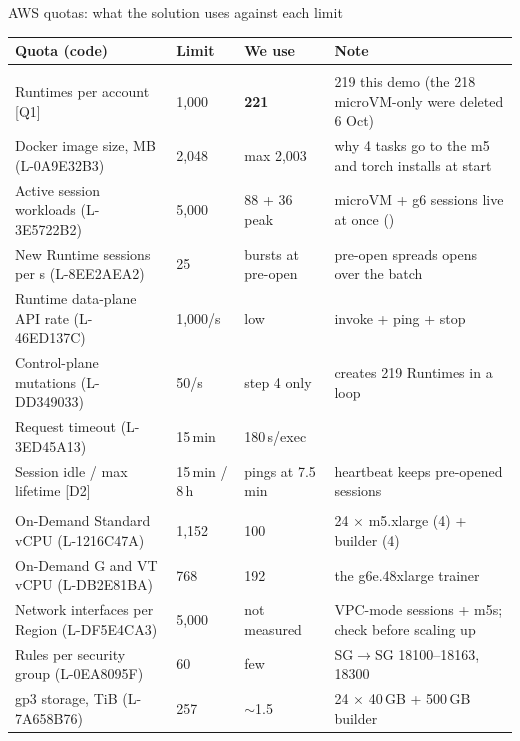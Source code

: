 \begin{frame}{AWS quotas: what the solution uses against each limit}
\tiny\setlength{\tabcolsep}{3pt}
\begin{tabularx}{\textwidth}{@{}P{0.36\textwidth}P{0.12\textwidth}P{0.13\textwidth}Y@{}}
\toprule
\textbf{Quota (code)} & \textbf{Limit} & \textbf{We use} & \textbf{Note}\\
\midrule
{}\\
Runtimes per account [Q1] & 1{,}000 & \textbf{221} & 219 this demo (the 218 microVM-only  were deleted 6 Oct)\\
Docker image size, MB (L-0A9E32B3) & 2{,}048 & max 2{,}003 & why 4 tasks go to the m5 and torch installs at start\\
Active session workloads (L-3E5722B2) & 5{,}000 & 88 + 36 peak & microVM + g6 sessions live at once ()\\
New Runtime sessions per s (L-8EE2AEA2) & 25 & bursts at pre-open & pre-open spreads opens over the batch\\
Runtime data-plane API rate (L-46ED137C) & 1{,}000/s & low & invoke + ping + stop\\
Control-plane mutations (L-DD349033) & 50/s & step 4 only & creates 219 Runtimes in a loop\\
Request timeout (L-3ED45A13) & 15\,min & 180\,s/exec & \\
Session idle / max lifetime [D2] & 15\,min / 8\,h & pings at 7.5\,min & heartbeat keeps pre-opened sessions\\
\\
On-Demand Standard vCPU (L-1216C47A) & 1{,}152 & 100 & 24 $\times$ m5.xlarge (4) + builder (4)\\
On-Demand G and VT vCPU (L-DB2E81BA) & 768 & 192 & the g6e.48xlarge trainer\\
Network interfaces per Region (L-DF5E4CA3) & 5{,}000 & not measured & VPC-mode sessions + m5s; check before scaling up\\
Rules per security group (L-0EA8095F) & 60 & few & SG$\rightarrow$SG 18100--18163, 18300\\
gp3 storage, TiB (L-7A658B76) & 257 & $\sim$1.5 & 24 $\times$ 40\,GB + 500\,GB builder\\
\bottomrule
\end{tabularx}
\end{frame}

